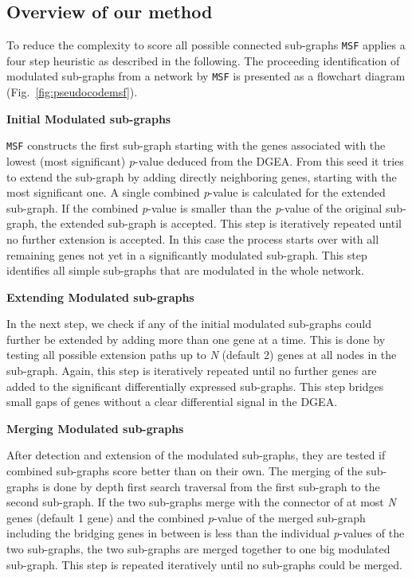 \documentclass[10pt,a4paper,twocolumn]{article}
\begin{document}
\subsection*{Overview of our method}

To reduce the complexity to score all possible connected sub-graphs
\texttt{MSF} applies a four step heuristic as described in the
following. The proceeding identification of modulated sub-graphs from a
network by \texttt{MSF} is presented as a flowchart diagram
(Fig.~\ref{fig:pseudocodemsf}).



\textbf{Initial Modulated sub-graphs}

\texttt{MSF} constructs the first sub-graph starting with the genes
associated with the lowest (most significant) \textit{p}-value deduced from
the DGEA. From this seed it tries to extend the sub-graph by adding directly
neighboring genes, starting with the most significant one. A single
combined \textit{p}-value is calculated for the extended sub-graph.
If the combined \textit{p}-value is smaller than the \textit{p}-value of
the original sub-graph,
the extended sub-graph is accepted. This step is
iteratively repeated until no further extension is accepted. In this case
the process starts over with all remaining genes not yet in a significantly
modulated sub-graph. This step identifies all simple sub-graphs that
are modulated in the whole network.\newline

\textbf{Extending Modulated sub-graphs}

In the next step, we check if any of the initial modulated sub-graphs 
could further be extended by adding more than one gene at a time. This is done
by testing all possible extension paths up to \emph{N} (default 2) genes at
all nodes in the sub-graph. Again, this step is iteratively repeated until
no further genes are added to the significant differentially expressed
sub-graphs. This step bridges small gaps of genes without a clear
differential signal in the DGEA.\newline

\textbf{Merging Modulated sub-graphs}

After detection and extension of the modulated sub-graphs, they are tested
if combined sub-graphs score better than on their own. The merging of the sub-graphs is done by depth first search traversal from the first sub-graph to the second sub-graph. If the two sub-graphs merge
with the connector of at most \emph{N} genes (default 1 gene) and the
combined \textit{p}-value of the merged sub-graph including the bridging
genes in between is less than the individual \textit{p}-values of the two
sub-graphs, the two sub-graphs are merged together to one big modulated
sub-graph. This step is repeated iteratively until no sub-graphs could be
merged.\newline
\end{document}
